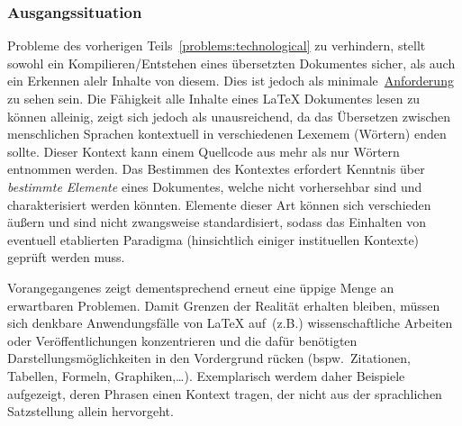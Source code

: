 \subsubsection{Ausgangssituation}
Probleme des vorherigen Teils~\ref{problems:technological} zu verhindern, stellt sowohl ein Kompilieren/Entstehen eines übersetzten Dokumentes sicher, als auch ein Erkennen alelr Inhalte von diesem. Dies ist jedoch als minimale~\hyperref[technologies:demands]{Anforderung} zu sehen sein. Die Fähigkeit alle Inhalte eines \LaTeX{} Dokumentes lesen zu können alleinig, zeigt sich jedoch als unausreichend, da das Übersetzen zwischen menschlichen Sprachen kontextuell in verschiedenen Lexemem (Wörtern) enden sollte.%
Dieser Kontext kann einem Quellcode aus mehr als nur Wörtern entnommen werden. Das Bestimmen des Kontextes erfordert Kenntnis über \textit{bestimmte Elemente} eines Dokumentes, welche nicht vorhersehbar sind und charakterisiert werden könnten. Elemente dieser Art können sich verschieden äußern und sind nicht zwangsweise standardisiert, sodass das Einhalten von eventuell etablierten Paradigma (hinsichtlich einiger instituellen Kontexte) geprüft werden muss. 

Vorangegangenes zeigt dementsprechend erneut eine üppige Menge an erwartbaren Problemen. Damit Grenzen der Realität erhalten bleiben, %
müssen sich denkbare Anwendungsfälle von \LaTeX{} auf\ (z.B.) wissenschaftliche Arbeiten oder Veröffentlichungen konzentrieren und die dafür benötigten Darstellungsmöglichkeiten in den Vordergrund rücken (bspw.\ Zitationen, Tabellen, Formeln, Graphiken,\ldots).%
Exemplarisch werdem daher Beispiele aufgezeigt, deren Phrasen einen Kontext tragen, der nicht aus der sprachlichen Satzstellung allein hervorgeht. 



